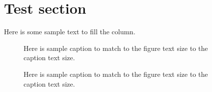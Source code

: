 \documentclass[aps,prb,twocolumn,superscriptaddress,amsmath]{revtex4-2}
\begin{document}
%
\section{Test section}

Here is some sample text to fill the column. 

\begin{figure}[h]
    \centering
    
    \caption{Here is sample caption to match to the figure text size to the caption text size.}
\end{figure}

\vfill\null

\newpage

\begin{figure}[h]
    \centering
    
    \caption{Here is sample caption to match to the figure text size to the caption text size.}
\end{figure}
\end{document}
